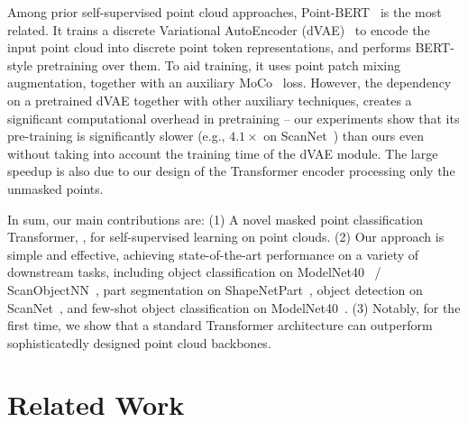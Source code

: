 \documentclass[runningheads]{llncs}
\begin{document}
Among prior self-supervised point cloud approaches, Point-BERT~\cite{yu2021point} is the most related.  It trains a discrete Variational AutoEncoder (dVAE)~\cite{dvae} to encode the input point cloud into discrete point token representations, and performs BERT-style pretraining over them.
To aid training, it uses point patch mixing augmentation, together with an auxiliary MoCo~\cite{he2020momentum} loss.
However, the dependency on a pretrained dVAE together with other auxiliary techniques, creates a significant computational overhead in pretraining -- our experiments show that its pre-training is significantly slower (e.g., $4.1\times$ on ScanNet~\cite{dai2017scannet}) than ours even without taking into account the training time of the dVAE module.
The large speedup is also due to our design of the Transformer encoder processing only the unmasked points.

In sum, our main contributions are: (1) A novel masked point classification Transformer, \emph{\methodname{}}, for self-supervised learning on point clouds. (2) Our approach is simple and effective, achieving state-of-the-art performance on a variety of downstream tasks, including object classification on ModelNet40~\cite{wu20153d} / ScanObjectNN~\cite{uy2019revisiting}, part segmentation on ShapeNetPart~\cite{yi2016scalable}, object detection on ScanNet~\cite{dai2017scannet}, and few-shot object classification on ModelNet40~\cite{wu20153d}. (3) Notably, for the first time, we show that a standard Transformer architecture can outperform sophisticatedly designed point cloud backbones. \section{Related Work}
\end{document}
